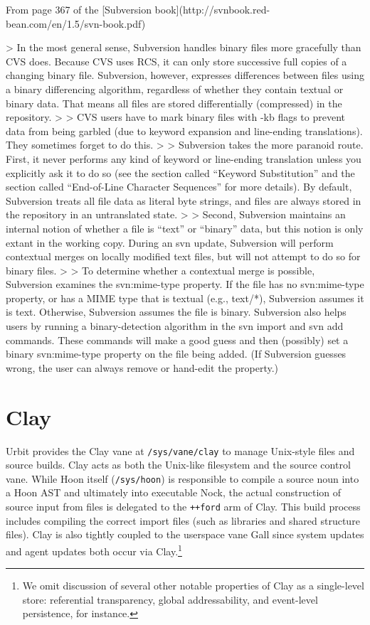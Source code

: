 \documentclass[twoside]{article}
\begin{document}
From page 367 of the [Subversion book](http://svnbook.red-bean.com/en/1.5/svn-book.pdf)

> In the most general sense, Subversion handles binary files more gracefully than CVS does. Because CVS uses RCS, it can only store successive full copies of a changing binary file. Subversion, however, expresses differences between files using a binary differencing algorithm, regardless of whether they contain textual or binary data. That means all files are stored differentially (compressed) in the repository.
> 
> CVS users have to mark binary files with -kb flags to prevent data from being garbled (due to keyword expansion and line-ending translations). They sometimes forget to do this.
> 
> Subversion takes the more paranoid route. First, it never performs any kind of keyword or line-ending translation unless you explicitly ask it to do so (see the section called “Keyword Substitution” and the section called “End-of-Line Character Sequences” for more details). By default, Subversion treats all file data as literal byte strings, and files are always stored in the repository in an untranslated state.
> 
> Second, Subversion maintains an internal notion of whether a file is “text” or “binary” data, but this notion is only extant in the working copy. During an svn update, Subversion will perform contextual merges on locally modified text files, but will not attempt to do so for binary files.
> 
> To determine whether a contextual merge is possible, Subversion examines the svn:mime-type property. If the file has no svn:mime-type property, or has a MIME type that is textual (e.g., text/*), Subversion assumes it is text. Otherwise, Subversion assumes the file is binary. Subversion also helps users by running a binary-detection algorithm in the svn import and svn add commands. These commands will make a good guess and then (possibly) set a binary svn:mime-type property on the file being added. (If Subversion guesses wrong, the user can always remove or hand-edit the property.)

\section{Clay}

Urbit provides the Clay vane at \texttt{/sys/vane/clay} to manage Unix-style files and source builds.  Clay acts as both the Unix-like filesystem and the source control vane.  While Hoon itself (\texttt{/sys/hoon}) is responsible to compile a source noun into a Hoon AST and ultimately into executable Nock, the actual construction of source input from files is delegated to the \texttt{++ford} arm of Clay.  This build process includes compiling the correct import files (such as libraries and shared structure files).  Clay is also tightly coupled to the userspace vane Gall since system updates and agent updates both occur via Clay.\footnote{We omit discussion of several other notable properties of Clay as a single-level store:  referential transparency, global addressability, and event-level persistence, for instance.}
\end{document}
